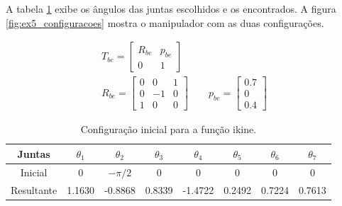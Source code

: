 \documentclass[a4paper,11pt]{article}
\theoremstyle{mytheor}
\begin{document}
A tabela \ref{tab:ex5_ikine_configuracao} exibe os ângulos das juntas escolhidos e os encontrados. A figura \ref{fig:ex5_configuracoes} mostra o manipulador com as duas configurações.


\begin{gather}
\label{eq:ex5_tbe}
T_{be} = \begin{bmatrix} R_{be} & p_{be} \\ 0 & 1 \end{bmatrix}
\\ 
\label{eq:ex5_rbe}
R_{be} = \begin{bmatrix} 0 & 0 & 1 \\ 0 & -1 & 0 \\ 1 & 0 & 0 \end{bmatrix}
\qquad
p_{be} = \begin{bmatrix} 0.7 \\ 0 \\ 0.4 \end{bmatrix}
\end{gather}

\begin{table}[!ht]
\centering
\caption{Configuração inicial para a função ikine.}
\label{tab:ex5_ikine_configuracao}

\begin{tabular}{|c|c|c|c|c|c|c|c|}
\hline
Juntas  & $\theta_1$ & $\theta_2$ & $\theta_3$ & $\theta_4$ & $\theta_5$ & $\theta_6$ & $\theta_7$ \\ \hline
Inicial     & 0 & $-\pi /2$ & 0 & 0 & 0 & 0 & 0 \\ \hline
Resultante     & 1.1630 & -0.8868 & 0.8339 & -1.4722 & 0.2492 & 0.7224 & 0.7613 \\ \hline
\end{tabular}
\end{table}
\end{document}
